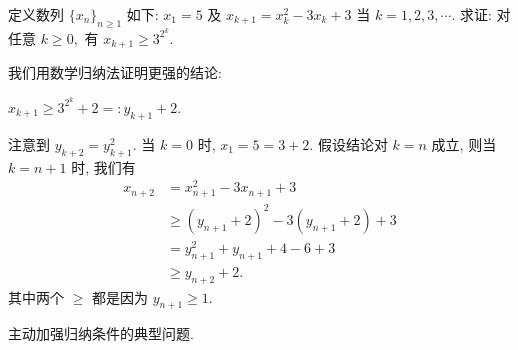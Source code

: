\begin{prob}
\label{prob:prob-2}
定义数列 $\{x_n\}_{n \ge 1}$ 如下:
$x_1 = 5$ 及 $x_{k+1} = x_k^2 - 3x_k + 3$ 当 $k = 1,2,3,\cdots$.
求证: 对任意 $k \ge 0,$ 有 $x_{k+1} \ge 3^{2^k}$.
\end{prob}

\begin{soln}
我们用数学归纳法证明更强的结论:

\begin{claim}
$x_{k+1} \ge 3^{2^k} + 2 =: y_{k+1} + 2.$
\end{claim}

\medskip

注意到 $y_{k+2} = y_{k+1}^2.$ 当 $k = 0$ 时, $x_1 = 5 = 3 + 2.$ 假设结论对 $k = n$ 成立, 则当 $k = n+1$ 时, 我们有
\begin{align*}
    x_{n+2} &= x_{n+1}^2 - 3x_{n+1} + 3\\
            &\ge (y_{n+1} + 2)^2 - 3(y_{n+1} + 2) + 3\\
            &= y_{n+1}^2 + y_{n+1} + 4 - 6 + 3\\
            &\ge y_{n+2} + 2.
\end{align*}
其中两个 $\ge$ 都是因为 $y_{n+1} \ge 1.$
\end{soln}

\begin{rem*}
主动加强归纳条件的典型问题.
\end{rem*}
